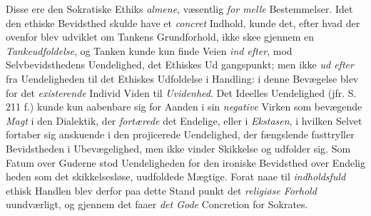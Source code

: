 Disse ere den Sokratiske Ethiks \emph{almene}, væsentlig \emph{for\-%
melle} Bestemmelser. Idet den ethiske Bevidsthed skulde have
et \emph{concret} Indhold, kunde det, efter hvad der ovenfor blev
udviklet om Tankens Grundforhold, ikke skee gjennem en
\emph{Tankeudfoldelse}, og Tanken kunde kun finde Veien \emph{ind
efter}, mod Selvbevidsthedens Uendelighed, det Ethiskes Ud\-%
gangspunkt; men ikke \emph{ud efter} fra Uendeligheden til det
Ethiskes Udfoldelse i Handling: i denne Bevægelse blev for
det \emph{existerende} Individ Viden til \emph{Uvidenhed}. Det Ideelles
Uendelighed (jfr. S. 211 f.) kunde kun aabenbare sig for Aanden
i sin \emph{negative} Virken som bevægende \emph{Magt} i den Dialektik, der
\emph{fortærede} det Endelige, eller i \emph{Ekstasen}, i hvilken Selvet
fortaber sig anskuende i den projicerede Uendelighed, der
fængslende fasttryller Bevidstheden i Ubevægelighed, men ikke
vinder Skikkelse og udfolder sig. Som Fatum over Guderne
stod Uendeligheden for den ironiske Bevidsthed over Endelig\-%
heden som det skikkelsesløse, uudfoldede Mægtige. Forat naae
til \emph{indholdsfuld} ethisk Handlen blev derfor paa dette Stand\-%
punkt det \emph{religiøse Forhold} uundværligt, og gjennem det
faaer \emph{det Gode} Concretion for Sokrates.

